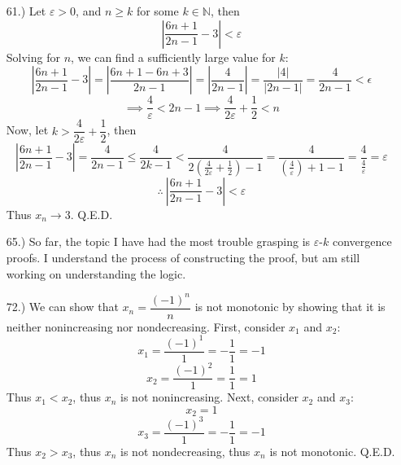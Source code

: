 \documentclass[12pt]{article}
\newcommand{\vertb}[1]{\left\vert#1\right\vert}
\newcommand{\parns}[1]{\left(#1\right)}
\begin{document}
\begin{itemize}




    \item [61.)] Let $\varepsilon>0$, and $n\geq k$ for some $k\in\mathbb{N}$, then
    \[\vertb{\frac{6n+1}{2n-1}-3}<\varepsilon\]
    Solving for $n$, we can find a sufficiently large value for $k$:
    \[\vertb{\frac{6n+1}{2n-1}-3}=\vertb{\frac{6n+1-6n+3}{2n-1}}=\vertb{\frac{4}{2n-1}}=\frac{\vertb{4}}{\vertb{2n-1}}=\frac{4}{2n-1}<\epsilon\]
    \[\implies \frac{4}{\varepsilon}<2n-1\implies\frac{4}{2\varepsilon}+\frac{1}{2}<n\]
    Now, let $k>\dfrac{4}{2\varepsilon}+\dfrac{1}{2}$, then
    \[\vertb{\frac{6n+1}{2n-1}-3}=\frac{4}{2n-1}\leq\frac{4}{2k-1}<\frac{4}{2\parns{\frac{4}{2\varepsilon}+\frac{1}{2}}-1}=\frac{4}{\parns{\frac{4}{\varepsilon}}+1-1}=\frac{4}{\frac{4}{\varepsilon}}=\varepsilon\]
    \[\therefore\ \vertb{\frac{6n+1}{2n-1}-3}<\varepsilon\]
    Thus $x_n\to3$. Q.E.D.




    \item [65.)] So far, the topic I have had the most trouble grasping is $\varepsilon$-$k$ convergence proofs. I understand the process of constructing the proof, but am still working on understanding the logic.







    \item [72.)] We can show that $x_n=\dfrac{(-1)^n}{n}$ is not monotonic by showing that it is neither nonincreasing nor nondecreasing. First, consider $x_1$ and $x_2$:
    \[x_1=\frac{(-1)^1}{1}=-\frac{1}{1}=-1\]
    \[x_2=\frac{(-1)^2}{1}=\frac{1}{1}=1\]
    Thus $x_1<x_2$, thus $x_n$ is not nonincreasing. Next, consider $x_2$ and $x_3$:
    \[x_2=1\]
    \[x_3=\frac{(-1)^3}{1}=-\frac{1}{1}=-1\]
    Thus $x_2>x_3$, thus $x_n$ is not nondecreasing, thus $x_n$ is not monotonic. Q.E.D.


\end{itemize}
\end{document}
